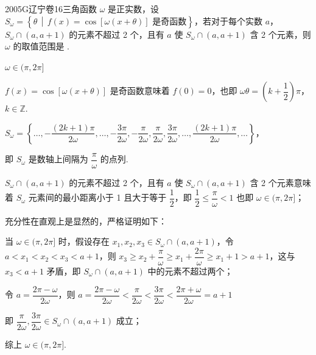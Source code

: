 
\begin{problem}{2005}{G}{辽宁卷}{16}{三角函数}
$\omega$ 是正实数，设 $ S_\omega = \left\{ \theta \,\middle|\, f(x) = \cos[\omega(x + \theta)] \text{ 是奇函数} \right\} $，若对于每个实数 $ a $，$ S_\omega \cap (a, a+1) $ 的元素不超过 2 个，且有 $ a $ 使 $ S_\omega \cap (a, a+1) $ 含 2 个元素，则 $ \omega $ 的取值范围是 \underline{\hspace{4em}}.
\end{problem}

\begin{answer}
$\omega \in (\pi, 2\pi]$
\end{answer}

\begin{solutions}
$f(x) = \cos[\omega(x + \theta)]$ 是奇函数意味着 $ f(0) = 0 $，也即 $ \omega\theta = \left(k + \dfrac{1}{2}\right)\pi $，$ k \in \mathbb{Z} $.  

$ S_\omega = \left\{ \dots, -\dfrac{(2k+1)\pi}{2\omega}, \dots, -\dfrac{3\pi}{2\omega}, -\dfrac{\pi}{2\omega}, \dfrac{\pi}{2\omega}, \dfrac{3\pi}{2\omega}, \dots, \dfrac{(2k+1)\pi}{2\omega}, \dots \right\} $，  

即 $ S_\omega $ 是数轴上间隔为 $ \dfrac{\pi}{\omega} $ 的点列.  

$ S_\omega \cap (a, a+1) $ 的元素不超过 2 个，且有 $ a $ 使 $ S_\omega \cap (a, a+1) $ 含 2 个元素意味着 $ S_\omega $ 元素间的最小距离小于 1 且大于等于 $ \dfrac{1}{2} $，即 $ \dfrac{1}{2} \leqslant \dfrac{\pi}{\omega} < 1 $ 也即 $ \omega \in (\pi, 2\pi] $；  

充分性在直观上是显然的，严格证明如下：  

当 $ \omega \in (\pi, 2\pi] $ 时，假设存在 $ x_1, x_2, x_3 \in S_\omega \cap (a, a+1) $，令 $ a < x_1 < x_2 < x_3 < a+1 $，则  
$ x_3 \geqslant x_2 + \dfrac{\pi}{\omega} \geqslant x_1 + \dfrac{2\pi}{\omega} \geqslant x_1 + 1 > a + 1 $，这与 $ x_3 < a+1 $ 矛盾，即 $ S_\omega \cap (a, a+1) $ 中的元素不超过两个；  

令 $ a = \dfrac{2\pi - \omega}{2\omega} $，则 $ a = \dfrac{2\pi - \omega}{2\omega} < \dfrac{\pi}{2\omega} < \dfrac{3\pi}{2\omega} < \dfrac{2\pi + \omega}{2\omega} = a + 1 $  

即 $ \dfrac{\pi}{2\omega}, \dfrac{3\pi}{2\omega} \in S_\omega \cap (a, a+1) $ 成立；  

综上 $ \omega \in (\pi, 2\pi] $.
\end{solutions}
